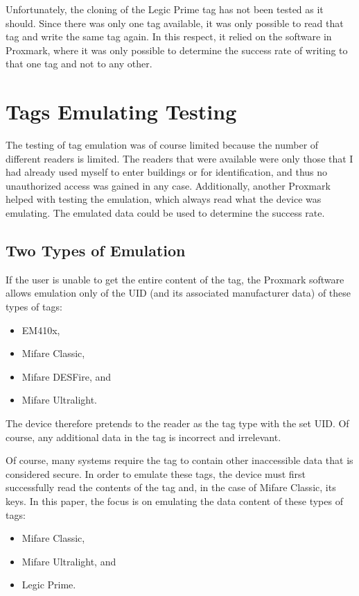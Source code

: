 Unfortunately, the cloning of the Legic Prime tag has not been tested as it should. Since there was only one tag available, it was only possible to read that tag and write the same tag again. In this respect, it relied on the software in Proxmark, where it was only possible to determine the success rate of writing to that one tag and not to any other.


\section{Tags Emulating Testing}

The testing of tag emulation was of course limited because the number of different readers is limited. The readers that were available were only those that I had already used myself to enter buildings or for identification, and thus no unauthorized access was gained in any case. Additionally, another Proxmark helped with testing the emulation, which always read what the device was emulating. The emulated data could be used to determine the success rate.

\subsection{Two Types of Emulation}
\label{subsec:twotypes}

If the user is unable to get the entire content of the tag, the Proxmark software allows emulation only of the UID (and its associated manufacturer data) of these types of tags:

\begin{itemize}
    \item EM410x,
    \item Mifare Classic,
    \item Mifare DESFire, and
    \item Mifare Ultralight.
\end{itemize}
The device therefore pretends to the reader as the tag type with the set UID. Of course, any additional data in the tag is incorrect and irrelevant.

Of course, many systems require the tag to contain other inaccessible data that is considered secure. In order to emulate these tags, the device must first successfully read the contents of the tag and, in the case of Mifare Classic, its keys. In this paper, the focus is on emulating the data content of these types of tags:

\begin{itemize}
    \item Mifare Classic,
    \item Mifare Ultralight, and
    \item Legic Prime.
\end{itemize}

